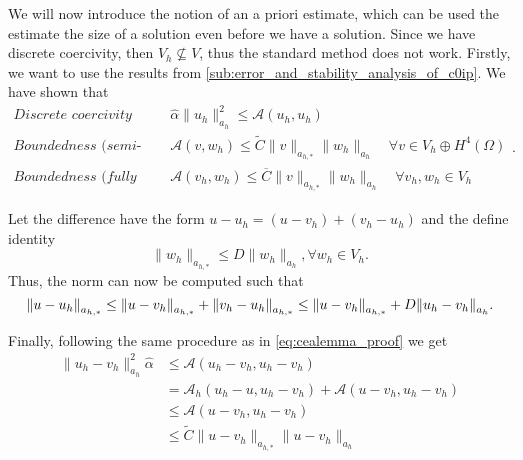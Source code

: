 We will now introduce the notion of an a priori estimate, which can be used the estimate the size of a solution even before we have a solution. Since we have discrete coercivity, then $V_{h} \not \subseteq  V$, thus the standard method does not work. Firstly, we want to use the results from \ref{sub:error_and_stability_analysis_of_c0ip}. We have shown that
\begin{equation*}
    \begin{split}
    \textit{Discrete coercivity } \quad & \hat{\alpha } \| u_{h} \|_{ a_{h} }^{ 2 }  \le  \mathcal{A} \left( u_{h}, u_{h} \right) \\
    \textit{Boundedness (semi-discrete) }\quad  & \mathcal{A} \left( v,w_{h} \right)  \le  \widetilde{C} \| v \|_{ a_{h,*} }^{  }  \| w_{h} \|_{ a_{h} }^{  } \quad \forall v \in  V_{h} \oplus H^{4}\left( \Omega  \right) \\
    \textit{Boundedness (fully discrete) }\quad  & \mathcal{A} \left( v_{h},w_{h} \right)  \le  \overline{C}  \| v \|_{ a_{h,*} }^{  }  \| w_{h} \|_{ a_{h} }^{  } \quad \forall v_{h}, w_{h} \in V_{h}
    \end{split}
.\end{equation*}

Let the difference have the form $u - u_{h} = (u - v_{h} )  + (v_{h} - u_{h})$ and the define identity
$$
\| w_{h} \|_{ a_{h,*} }^{  }  \le  D \| w_{h} \|_{ a_{h} }^{  }, \forall w_{h} \in V_{h} .
$$
Thus, the norm can now be computed such that\[
\| u - u_{h} \|_{ a_{h,*} }^{  } \le \|u - v_{h}  \|_{a_{h,*}  }^{  }  + \| v_{h} - u_{h} \|_{a_{h,*}  }^{  } \\
\le \| u -v_{h} \|_{ a_{h,*} }^{  }  + D \| u_{h} - v_{h} \|_{a_{h}  }^{  }.
\]

Finally, following the same procedure as in \eqref{eq:cealemma_proof} we get
\[
    \begin{split}
\| u_{h} - v_{h} \|_{a_{h}  }^{2  } \hat{\alpha } & \le  \mathcal{A} \left( u_{h} - v_{h}, u_{h} - v_{h} \right) \\
& =  \mathcal{A} _{h} \left( u_{h} -u, u_{h} -v_{h} \right) + \mathcal{A} \left( u - v_{h}, u_{h} - v_{h} \right) \\
 &  \le  \mathcal{A}  \left( u - v_{h}, u_{h} - v_{h} \right)   \\
 &\le  \widetilde{C} \| u - v_{h} \|_{ a_{h,*} }^{  } \| u- v_{h} \|_{ a_{h} }^{  }
    \end{split}
\]

